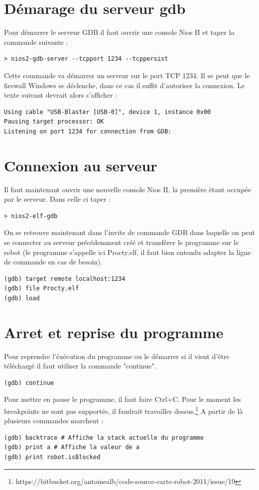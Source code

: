 \documentclass[a4paper]{report}
\begin{document}
\section{Démarage du serveur gdb}
Pour démarrer le serveur GDB il faut ouvrir une console Nios II et taper la commande suivante :
\begin{lstlisting}[frame=trBL]
> nios2-gdb-server --tcpport 1234 --tcppersist
\end{lstlisting}
Cette commande va démarrer un serveur sur le port TCP 1234. Il se peut que
le firewall Windows se déclenche, dans ce cas il suffit d'autoriser la connexion.
Le texte suivant devrait alors s'afficher :
\begin{lstlisting}[frame=trBL]
Using cable "USB-Blaster [USB-0]", device 1, instance 0x00
Pausing target processor: OK
Listening on port 1234 for connection from GDB:
\end{lstlisting}

\section{Connexion au serveur}
Il faut maintenant ouvrir une nouvelle console Nios II, la première étant
occupée par le serveur. Dans celle ci taper :
\begin{lstlisting}[frame=trBL]
> nios2-elf-gdb
\end{lstlisting}
On se retrouve maintenant dans l'invite de commande GDB dans laquelle on
peut se connecter au serveur précédemment créé et transférer le programme
sur le robot (le programme s'appelle ici Procty.elf, il faut bien entendu
adapter la ligne de commande en cas de besoin).
\begin{lstlisting}[frame=trBL]
(gdb) target remote localhost:1234
(gdb) file Procty.elf
(gdb) load
\end{lstlisting}

\section{Arret et reprise du programme}
Pour reprendre l'éxécution du programme ou le démarrer si il vient d'être
téléchargé il faut utiliser la commande "continue".
\begin{lstlisting}[frame=trBL]
(gdb) continue
\end{lstlisting}
Pour mettre en pause le programme, il faut faire Ctrl+C. Pour le moment
les breakpoints ne sont pas supportés, il faudrait travailler dessus.\footnote{https://bitbucket.org/antoinealb/code-source-carte-robot-2011/issue/19}
A partir de là plusieurs commandes marchent :
\begin{lstlisting}[frame=trBL]
(gdb) backtrace # Affiche la stack actuelle du programme
(gdb) print a # Affiche la valeur de a
(gdb) print robot.isBlocked
\end{lstlisting}
\end{document}
